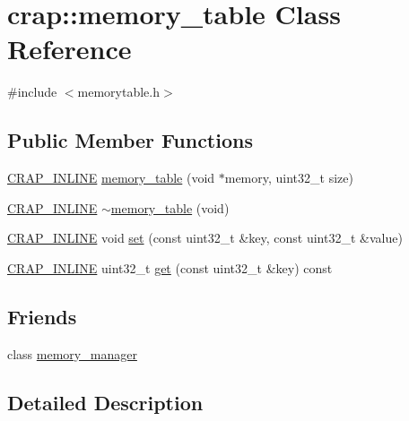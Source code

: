\hypertarget{classcrap_1_1memory__table}{\section{crap\+:\+:memory\+\_\+table Class Reference}
\label{classcrap_1_1memory__table}
}


{\ttfamily \#include $<$memorytable.\+h$>$}

\subsection*{Public Member Functions}
\begin{DoxyCompactItemize}
\item 
\hyperlink{config__x86_8h_a5a40526b8d842e7ff731509998bb0f1c}{C\+R\+A\+P\+\_\+\+I\+N\+L\+I\+N\+E} \hyperlink{classcrap_1_1memory__table_a36a58b0a3a584372ab689ccc4dd220ce}{memory\+\_\+table} (void $\ast$memory, uint32\+\_\+t size)
\item 
\hyperlink{config__x86_8h_a5a40526b8d842e7ff731509998bb0f1c}{C\+R\+A\+P\+\_\+\+I\+N\+L\+I\+N\+E} \hyperlink{classcrap_1_1memory__table_a69ac77f6f1e3000a95d0b37aca33b702}{$\sim$memory\+\_\+table} (void)
\item 
\hyperlink{config__x86_8h_a5a40526b8d842e7ff731509998bb0f1c}{C\+R\+A\+P\+\_\+\+I\+N\+L\+I\+N\+E} void \hyperlink{classcrap_1_1memory__table_a58222ecf35b20add743a93cdf3cb29b5}{set} (const uint32\+\_\+t \&key, const uint32\+\_\+t \&value)
\item 
\hyperlink{config__x86_8h_a5a40526b8d842e7ff731509998bb0f1c}{C\+R\+A\+P\+\_\+\+I\+N\+L\+I\+N\+E} uint32\+\_\+t \hyperlink{classcrap_1_1memory__table_a7941a3696642176ac928536bd0a0ff42}{get} (const uint32\+\_\+t \&key) const 
\end{DoxyCompactItemize}
\subsection*{Friends}
\begin{DoxyCompactItemize}
\item 
class \hyperlink{classcrap_1_1memory__table_a242c93ac6853d673bc3e068a57510842}{memory\+\_\+manager}
\end{DoxyCompactItemize}


\subsection{Detailed Description}


